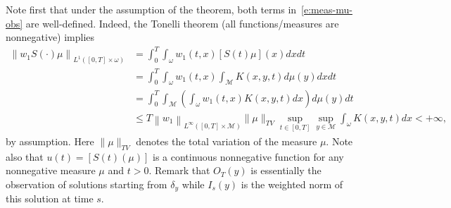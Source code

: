 \documentclass[11pt]{article}
\numberwithin{equation}{section}
\theoremstyle{definition}
\newcommand{\M}{\ensuremath{\mathcal M}}
\newcommand\nor[2]{\left\|#1\right\|_{#2}}
\begin{document}
Note first that under the assumption of the theorem, both terms in~\eqref{e:meas-mu-obs} are well-defined. Indeed, the Tonelli theorem (all functions/measures are nonnegative) implies
\begin{align*}
\nor{w_1 S(\cdot)\mu}{L^1([0,T]\times \omega)} & = \int_0^T \int_\omega w_1(t,x) [S(t)\mu](x) dx dt \\
& = \int_0^T \int_\omega w_1(t,x) \int_{\M} K(x,y,t)d\mu(y) dx dt \\
& = \int_0^T \int_{\M} \left(\int_\omega w_1(t, x) K(x,y,t)dx \right)d\mu(y) dt \\
& \leq T \nor{w_1}{L^\infty([0,T]\times \M)} \|\mu\|_{TV} \sup_{t\in [0,T]} \sup_{y\in \M} \int_\omega K(x,y,t)dx
< + \infty,
\end{align*}
by assumption. Here $\|\mu\|_{TV}$ denotes the total variation of the measure $\mu$.
Note also that $u(t) = [S(t)(\mu)]$ is a continuous nonnegative function for any nonnegative measure $\mu$ and $t>0$.
Remark that $O_T(y)$ is essentially the observation of solutions starting from $\delta_y$ while $I_s(y)$ is the weighted norm of this solution at time $s$.
\end{document}
